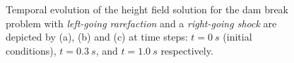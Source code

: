 \documentclass[9pt,a4paper]{article}
\begin{document}
	\begin{figure}[H]
		\hfill
		\caption{Temporal evolution of the height field solution for the dam break problem with {\em left-going rarefaction} and a {\em right-going shock}  are depicted by (a), (b) and (c) at time steps: $t=0~s$ (initial conditions), $t = 0.3~s$, and $t = 1.0~s$ respectively.  }
		\label{fig:hor2}
	\end{figure}
	
\end{document}
